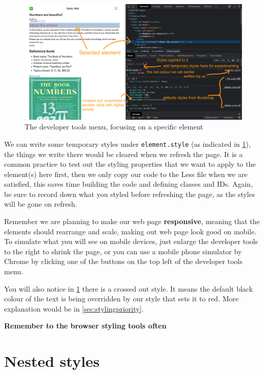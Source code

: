 \begin{figure}[h]
\centering
\includegraphics[width=14cm]{images/chn6-devtools2.png}
\caption{The developer tools menu, focusing on a specific element}
\label{fig:devtools2}
\end{figure}

We can write some temporary styles under \texttt{element.style} (as indicated in \cref{fig:devtools2}), the things we write there would be cleared when we refresh the page. It is a common practice to test out the styling properties that we want to apply to the element(s) here first, then we only copy our code to the Less file when we are satisfied, this saves time building the code and defining classes and IDs. Again, be sure to record down what you styled before refreshing the page, as the styles will be gone on refresh. 
\vspace{6mm}

Remember we are planning to make our web page \textbf{responsive}, meaning that the elements should rearrange and scale, making out web page look good on mobile. To simulate what you will see on mobile devices, just enlarge the developer tools to the right to shrink the page, or you can use a mobile phone simulator by Chrome by clicking one of the buttons on the top left of the developer tools menu.

You will also notice in \cref{fig:devtools2} there is a crossed out style. It means the default black colour of the text is being overridden by our style that sets it to red. More explanation would be in \cref{sec:stylingpriority}.
\vspace{6mm}

\textbf{Remember to the browser styling tools often}

\section{Nested styles}
\label{sec:nestedstyles}

